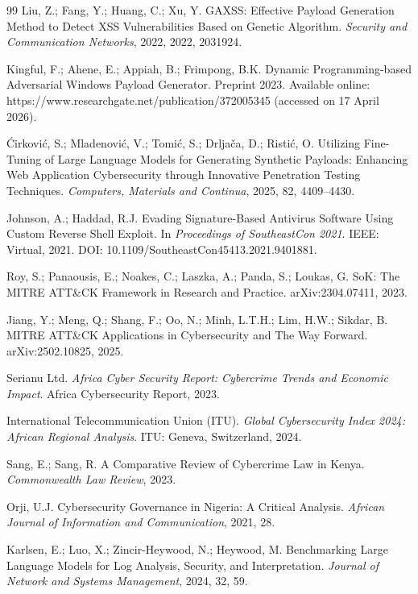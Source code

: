 \documentclass[12pt,oneside]{report}
\begin{document}
\begin{thebibliography}{99}
Liu, Z.; Fang, Y.; Huang, C.; Xu, Y. GAXSS: Effective Payload Generation Method to Detect XSS Vulnerabilities Based on Genetic Algorithm. \textit{Security and Communication Networks}, 2022, 2022, 2031924.

Kingful, F.; Ahene, E.; Appiah, B.; Frimpong, B.K. Dynamic Programming-based Adversarial Windows Payload Generator. Preprint 2023. Available online: https://www.researchgate.net/publication/372005345 (accessed on 17 April 2026).

\'{C}irkovi\'{c}, S.; Mladenovi\'{c}, V.; Tomi\'{c}, S.; Drlja\v{c}a, D.; Risti\'{c}, O. Utilizing Fine-Tuning of Large Language Models for Generating Synthetic Payloads: Enhancing Web Application Cybersecurity through Innovative Penetration Testing Techniques. \textit{Computers, Materials and Continua}, 2025, 82, 4409--4430.

Johnson, A.; Haddad, R.J. Evading Signature-Based Antivirus Software Using Custom Reverse Shell Exploit. In \textit{Proceedings of SoutheastCon 2021}. IEEE: Virtual, 2021. DOI: 10.1109/SoutheastCon45413.2021.9401881.

Roy, S.; Panaousis, E.; Noakes, C.; Laszka, A.; Panda, S.; Loukas, G. SoK: The MITRE ATT\&CK Framework in Research and Practice. arXiv:2304.07411, 2023.

Jiang, Y.; Meng, Q.; Shang, F.; Oo, N.; Minh, L.T.H.; Lim, H.W.; Sikdar, B. MITRE ATT\&CK Applications in Cybersecurity and The Way Forward. arXiv:2502.10825, 2025.

Serianu Ltd. \textit{Africa Cyber Security Report: Cybercrime Trends and Economic Impact}. Africa Cybersecurity Report, 2023.

International Telecommunication Union (ITU). \textit{Global Cybersecurity Index 2024: African Regional Analysis}. ITU: Geneva, Switzerland, 2024.

Sang, E.; Sang, R. A Comparative Review of Cybercrime Law in Kenya. \textit{Commonwealth Law Review}, 2023.

Orji, U.J. Cybersecurity Governance in Nigeria: A Critical Analysis. \textit{African Journal of Information and Communication}, 2021, 28.

Karlsen, E.; Luo, X.; Zincir-Heywood, N.; Heywood, M. Benchmarking Large Language Models for Log Analysis, Security, and Interpretation. \textit{Journal of Network and Systems Management}, 2024, 32, 59.


\end{thebibliography}
\end{document}
